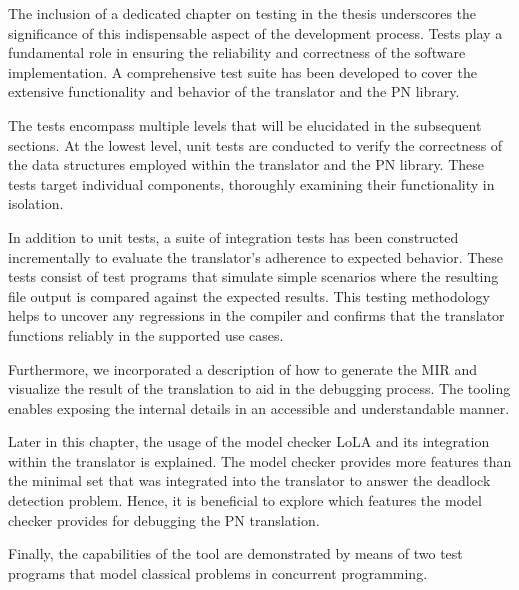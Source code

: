 The inclusion of a dedicated chapter on testing in the thesis underscores
the significance of this indispensable aspect of the development process.
Tests play a fundamental role in ensuring
the reliability and correctness of the software implementation.
A comprehensive test suite has been developed
to cover the extensive functionality and behavior
of the translator and the \acrshort{PN} library.

The tests encompass multiple levels
that will be elucidated in the subsequent sections.
At the lowest level, unit tests are conducted
to verify the correctness of the data structures
employed within the translator and the \acrshort{PN} library.
These tests target individual components,
thoroughly examining their functionality in isolation.

In addition to unit tests,
a suite of integration tests has been constructed incrementally
to evaluate the translator's adherence to expected behavior.
These tests consist of test programs that simulate simple scenarios where
the resulting file output is compared against the expected results.
This testing methodology helps to uncover any regressions in the compiler
and confirms that the translator functions reliably in the supported use cases.

Furthermore, we incorporated a description of how to generate the \acrshort{MIR} and
visualize the result of the translation to aid in the debugging process.
The tooling enables exposing the internal details in an accessible and understandable manner.

Later in this chapter, the usage of the model checker \acrshort{LoLA}
and its integration within the translator is explained.
The model checker provides more features than the minimal set
that was integrated into the translator to answer the deadlock detection problem.
Hence, it is beneficial to explore
which features the model checker provides for debugging the \acrshort{PN} translation.

Finally, the capabilities of the tool are demonstrated by means of two test programs
that model classical problems in concurrent programming.